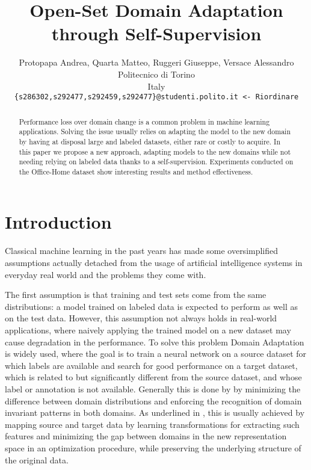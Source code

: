 \documentclass[10pt,twocolumn,letterpaper]{article}
\begin{document}
\title{Open-Set Domain Adaptation through Self-Supervision}

\author{Protopapa Andrea, Quarta Matteo, Ruggeri Giuseppe, Versace Alessandro\\
Politecnico di Torino\\
Italy\\
{\tt\small \{s286302,s292477,s292459,s292477\}@studenti.polito.it <- Riordinare}
}
\maketitle

\begin{abstract}
  Performance loss over domain change is a common problem in machine learning applications.
  Solving the issue usually relies on adapting the model to the new domain by having at disposal large and labeled datasets, either rare or costly to acquire.
  In this paper we propose a new approach, adapting models to the new domains while not needing relying on labeled data thanks to a self-supervision.
  Experiments conducted on the Office-Home dataset show interesting results and method effectiveness.
\end{abstract}

\section{Introduction}
\label{sec:intro}
Classical machine learning in the past years has made some oversimplified assumptions actually detached %
from the usage of artificial intelligence systems in everyday real world and the problems they come with.

The first assumption is that training and test sets come from the same distributions:
a model trained on labeled data is expected to perform as well as on the test data.
However, this assumption not always holds in real-world applications, 
where naively applying the trained model on a new dataset may cause degradation in the performance.
To solve this problem Domain Adaptation is widely used, 
where the goal is to train a neural network on a source dataset for which labels are available and search for good performance on a target dataset, 
which is related to but significantly different from the source dataset, 
and whose label or annotation is not available. 
Generally this is done by by minimizing the difference between domain distributions and enforcing the recognition of domain invariant patterns in both domains. 
As underlined in \cite{domainAdaptFarahani}, 
this is usually achieved by mapping source and target data by learning transformations for extracting such features and minimizing the gap between domains in the new representation space in an optimization procedure,
while preserving the underlying structure of the original data. 
\end{document}
